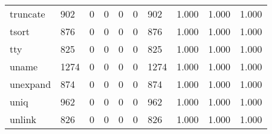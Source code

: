 \begin{longtable}{lp{2.0cm}p{2.0cm}p{2.0cm}p{2.0cm}p{2.0cm}p{2.0cm}p{2.0cm}p{2.0cm}p{2.0cm}}
truncate  &                    902 &                                  0 &                                 0 &                                0 &                                 0 &                             902 &                                   1.000 &                                  1.000 &                                1.000 \\
tsort     &                    876 &                                  0 &                                 0 &                                0 &                                 0 &                             876 &                                   1.000 &                                  1.000 &                                1.000 \\
tty       &                    825 &                                  0 &                                 0 &                                0 &                                 0 &                             825 &                                   1.000 &                                  1.000 &                                1.000 \\
uname     &                   1274 &                                  0 &                                 0 &                                0 &                                 0 &                            1274 &                                   1.000 &                                  1.000 &                                1.000 \\
unexpand  &                    874 &                                  0 &                                 0 &                                0 &                                 0 &                             874 &                                   1.000 &                                  1.000 &                                1.000 \\
uniq      &                    962 &                                  0 &                                 0 &                                0 &                                 0 &                             962 &                                   1.000 &                                  1.000 &                                1.000 \\
unlink    &                    826 &                                  0 &                                 0 &                                0 &                                 0 &                             826 &                                   1.000 &                                  1.000 &                                1.000 \\

\end{longtable}
